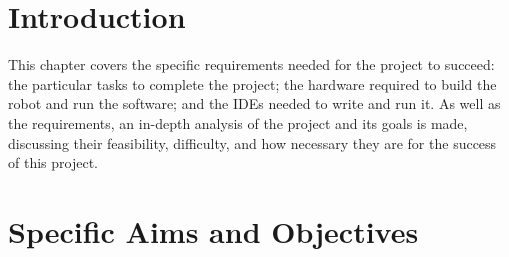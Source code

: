 \documentclass{report}
\begin{document}
    \section{Introduction}
    
    This chapter covers the specific requirements needed for the project to succeed: the particular tasks to complete the project; the hardware required to build the robot and run the software; and the IDEs needed to write and run it. As well as the requirements, an in-depth analysis of the project and its goals is made, discussing their feasibility, difficulty, and how necessary they are for the success of this project.
    
    \section{Specific Aims and Objectives} \label{sec:objectives}
    
\end{document}
